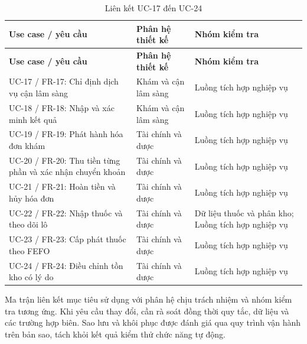 {\small\setlength{\tabcolsep}{3pt}\renewcommand{\arraystretch}{1.12}
\begin{longtable}{@{}L{\textwidth-4.8pt\relax} L{\textwidth-3.24pt\relax} L{\textwidth-3.96pt\relax}@{}}
\caption{Liên kết UC-17 đến UC-24}\\
\toprule
\textbf{Use case /\allowbreak{} yêu cầu} & \textbf{Phân hệ thiết kế} & \textbf{Nhóm kiểm tra}\\\midrule
\endfirsthead
\toprule
\textbf{Use case /\allowbreak{} yêu cầu} & \textbf{Phân hệ thiết kế} & \textbf{Nhóm kiểm tra}\\\midrule
\endhead
\bottomrule\endlastfoot
UC-17 /\allowbreak{} FR-17:\allowbreak{} Chỉ định dịch vụ cận lâm sàng & Khám và cận lâm sàng & Luồng tích hợp nghiệp vụ\\[3pt]
UC-18 /\allowbreak{} FR-18:\allowbreak{} Nhập và xác minh kết quả & Khám và cận lâm sàng & Luồng tích hợp nghiệp vụ\\[3pt]
UC-19 /\allowbreak{} FR-19:\allowbreak{} Phát hành hóa đơn khám & Tài chính và dược & Luồng tích hợp nghiệp vụ\\[3pt]
UC-20 /\allowbreak{} FR-20:\allowbreak{} Thu tiền từng phần và xác nhận chuyển khoản & Tài chính và dược & Luồng tích hợp nghiệp vụ\\[3pt]
UC-21 /\allowbreak{} FR-21:\allowbreak{} Hoàn tiền và hủy hóa đơn & Tài chính và dược & Luồng tích hợp nghiệp vụ\\[3pt]
UC-22 /\allowbreak{} FR-22:\allowbreak{} Nhập thuốc và theo dõi lô & Tài chính và dược & Dữ liệu thuốc và phân kho; Luồng tích hợp nghiệp vụ\\[3pt]
UC-23 /\allowbreak{} FR-23:\allowbreak{} Cấp phát thuốc theo FEFO & Tài chính và dược & Luồng tích hợp nghiệp vụ\\[3pt]
UC-24 /\allowbreak{} FR-24:\allowbreak{} Điều chỉnh tồn kho có lý do & Tài chính và dược & Luồng tích hợp nghiệp vụ\\[3pt]
\end{longtable}}
Ma trận liên kết mục tiêu sử dụng với phân hệ chịu trách nhiệm và nhóm kiểm tra tương ứng.\allowbreak{} Khi yêu cầu thay đổi, cần rà soát đồng thời quy tắc, dữ liệu và các trường hợp biên.\allowbreak{} Sao lưu và khôi phục được đánh giá qua quy trình vận hành trên bản sao, tách khỏi kết quả kiểm thử chức năng tự động.\allowbreak{}

\clearpage

